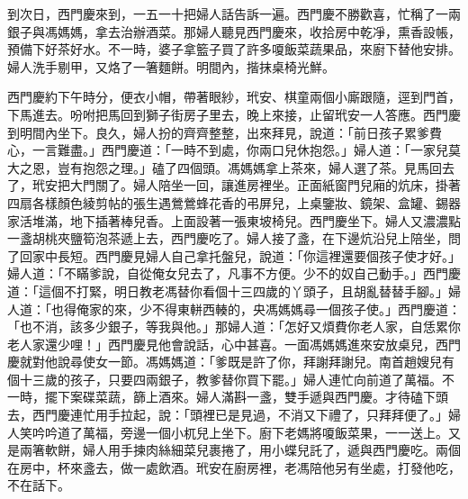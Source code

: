 到次日，西門慶來到，一五一十把婦人話告訴一遍。西門慶不勝歡喜，忙稱了一兩銀子與馮媽媽，拿去治辦酒菜。那婦人聽見西門慶來，收拾房中乾凈，熏香設帳，預備下好茶好水。不一時，婆子拿籃子買了許多嗄飯菜蔬果品，來廚下替他安排。婦人洗手剔甲，又烙了一箸麵餅。明間內，揩抹桌椅光鮮。

西門慶約下午時分，便衣小帽，帶著眼紗，玳安、棋童兩個小廝跟隨，逕到門首，下馬進去。吩咐把馬回到獅子街房子里去，晚上來接，止留玳安一人答應。西門慶到明間內坐下。良久，婦人扮的齊齊整整，出來拜見，說道：「前日孩子累爹費心，一言難盡。」西門慶道：「一時不到處，你兩口兒休抱怨。」婦人道：「一家兒莫大之恩，豈有抱怨之理。」磕了四個頭。馮媽媽拿上茶來，婦人選了茶。見馬回去了，玳安把大門關了。婦人陪坐一回，讓進房裡坐。正面紙窗門兒廂的炕床，掛著四扇各樣顏色綾剪帖的張生遇鶯鶯蜂花香的弔屏兒，上桌鑒妝、鏡架、盒罐、錫器家活堆滿，地下插著棒兒香。上面設著一張東坡椅兒。西門慶坐下。婦人又濃濃點一盞胡桃夾鹽筍泡茶遞上去，西門慶吃了。婦人接了盞，在下邊炕沿兒上陪坐，問了回家中長短。西門慶見婦人自己拿托盤兒，說道：「你這裡還要個孩子使才好。」婦人道：「不瞞爹說，自從俺女兒去了，凡事不方便。少不的奴自己動手。」西門慶道：「這個不打緊，明日教老馮替你看個十三四歲的丫頭子，且胡亂替替手腳。」婦人道：「也得俺家的來，少不得東軿西輳的，央馮媽媽尋一個孩子使。」西門慶道：「也不消，該多少銀子，等我與他。」那婦人道：「怎好又煩費你老人家，自恁累你老人家還少哩！」西門慶見他會說話，心中甚喜。一面馮媽媽進來安放桌兒，西門慶就對他說尋使女一節。馮媽媽道：「爹既是許了你，拜謝拜謝兒。南首趙嫂兒有個十三歲的孩子，只要四兩銀子，教爹替你買下罷。」婦人連忙向前道了萬福。不一時，擺下案碟菜蔬，篩上酒來。婦人滿斟一盞，雙手遞與西門慶。才待磕下頭去，西門慶連忙用手拉起，說：「頭裡已是見過，不消又下禮了，只拜拜便了。」婦人笑吟吟道了萬福，旁邊一個小杌兒上坐下。廚下老媽將嗄飯菜果，一一送上。又是兩箸軟餅，婦人用手揀肉絲細菜兒裹捲了，用小蝶兒託了，遞與西門慶吃。兩個在房中，杯來盞去，做一處飲酒。玳安在廚房裡，老馮陪他另有坐處，打發他吃，不在話下。

